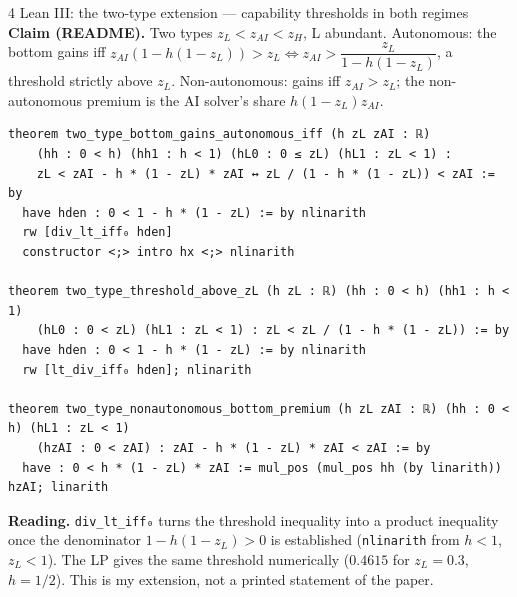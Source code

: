 \documentclass[aspectratio=169,11pt]{beamer}
\begin{document}
\begin{frame}[fragile]{4 \textperiodcentered{} Lean III: the two-type extension --- capability thresholds in both regimes}
  \scriptsize
  \textbf{Claim (README).} Two types $z_L<z_{AI}<z_H$, L abundant. Autonomous: the bottom gains iff
  $z_{AI}(1-h(1-z_L))>z_L \iff z_{AI}>\dfrac{z_L}{1-h(1-z_L)}$, a threshold strictly above $z_L$.
  Non-autonomous: gains iff $z_{AI}>z_L$; the non-autonomous premium is the AI solver's share $h(1-z_L)z_{AI}$.
  \vspace{-2pt}
  \begin{lstlisting}[basicstyle=\ttfamily\tiny]
theorem two_type_bottom_gains_autonomous_iff (h zL zAI : ℝ)
    (hh : 0 < h) (hh1 : h < 1) (hL0 : 0 ≤ zL) (hL1 : zL < 1) :
    zL < zAI - h * (1 - zL) * zAI ↔ zL / (1 - h * (1 - zL)) < zAI := by
  have hden : 0 < 1 - h * (1 - zL) := by nlinarith
  rw [div_lt_iff₀ hden]
  constructor <;> intro hx <;> nlinarith

theorem two_type_threshold_above_zL (h zL : ℝ) (hh : 0 < h) (hh1 : h < 1)
    (hL0 : 0 < zL) (hL1 : zL < 1) : zL < zL / (1 - h * (1 - zL)) := by
  have hden : 0 < 1 - h * (1 - zL) := by nlinarith
  rw [lt_div_iff₀ hden]; nlinarith

theorem two_type_nonautonomous_bottom_premium (h zL zAI : ℝ) (hh : 0 < h) (hL1 : zL < 1)
    (hzAI : 0 < zAI) : zAI - h * (1 - zL) * zAI < zAI := by
  have : 0 < h * (1 - zL) * zAI := mul_pos (mul_pos hh (by linarith)) hzAI; linarith
  \end{lstlisting}
  \textbf{Reading.} \texttt{div\_lt\_iff₀} turns the threshold inequality into a product inequality once the
  denominator $1-h(1-z_L)>0$ is established (\texttt{nlinarith} from $h<1$, $z_L<1$). The LP gives the same
  threshold numerically ($0.4615$ for $z_L=0.3$, $h=1/2$). This is my extension, not a printed statement of the paper.
\end{frame}
\end{document}
